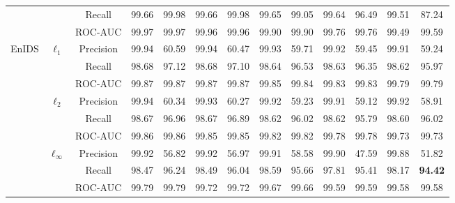 \documentclass[conference]{IEEEtran}
\begin{document}
\begin{table}
\begin{tabular}{|c|c|c|c|c|c|c|c|c|c|c|c|c|}
			&  & Recall & 99.66 & 99.98 & 99.66 & 99.98 & 99.65 & 99.05 & 99.64 & 96.49 & 99.51 & 87.24
			\\
			
			&  & ROC-AUC & 99.97 & 99.97 & 99.96 & 99.96 & 99.90 & 99.90 & 99.76 & 99.76 & 99.49 & 99.59
			\\
			\hline
			\multirow{9}{*}{EnIDS} & \multirow{3}{*}{\( \ell_1 \)} & Precision & 99.94 & 60.59 & 99.94 & 60.47 & 99.93 & 59.71 & 99.92 & 59.45 & 99.91 & 59.24
			\\
			
			&  & Recall & 98.68 & 97.12 & 98.68 & 97.10 & 98.64 & 96.53 & 98.63 & 96.35 & 98.62 & 95.97
			\\
			
			&  & ROC-AUC & 99.87 & 99.87 & 99.87 & 99.87 & 99.85 & 99.84 & 99.83 & 99.83 & 99.79 & 99.79
			\\
			\cline{2-13}
			& \multirow{3}{*}{\( \ell_2 \)} & Precision & 99.94 & 60.34 & 99.93 & 60.27 & 99.92 & 59.23 & 99.91 & 59.12 & 99.92 & 58.91
			\\
			
			&  & Recall & 98.67 & 96.96 & 98.67 & 96.89 & 98.62 & 96.02 & 98.62 & 95.79 & 98.60 & 96.02
			\\
			
			&  & ROC-AUC & 99.86 & 99.86 & 99.85 & 99.85 & 99.82 & 99.82 & 99.78 & 99.78 & 99.73 & 99.73
			\\
			\cline{2-13}
			& \multirow{3}{*}{\( \ell_\infty \)} & Precision & 99.92 & 56.82 & 99.92 & 56.97 & 99.91 & 58.58 & 99.90 & 47.59 & 99.88 & 51.82
			\\
			
			&  & Recall & 98.47 & 96.24 & 98.49 & 96.04 & 98.59 & 95.66 & 97.81 & 95.41 & 98.17 & \cellcolor{yellow!50}\textbf{94.42}
			\\
			
			&  & ROC-AUC & 99.79 & 99.79 & 99.72 & 99.72 & 99.67 & 99.66 & 99.59 & 99.59 & 99.58 & 99.58
			\\
			\hline
		\end{tabular}

	\end{table}

	
	
\end{document}
